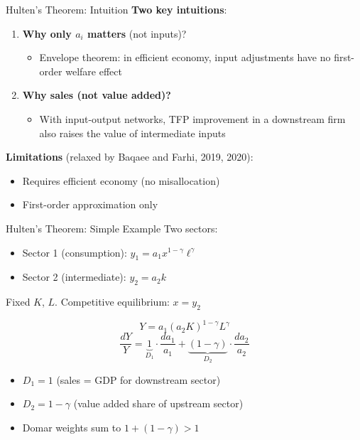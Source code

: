 \documentclass[blue]{beamer}
\begin{document}
\begin{frame}{Hulten's Theorem: Intuition}
	\textbf{Two key intuitions}:
	
	\bigskip
	\begin{enumerate}
		\item \textbf{Why only $a_i$ matters} (not inputs)?
		\begin{itemize}
			\item Envelope theorem: in efficient economy, input adjustments have no first-order welfare effect
		\end{itemize}
		
		\bigskip
		\item \textbf{Why sales (not value added)?}
		\begin{itemize}
			\item With input-output networks, TFP improvement in a downstream firm also raises the value of intermediate inputs
		\end{itemize}
	\end{enumerate}
	
	\bigskip
	\textbf{Limitations} (relaxed by Baqaee and Farhi, 2019, 2020):
	\begin{itemize}
		\item Requires efficient economy (no misallocation)
		\item First-order approximation only
	\end{itemize}
\end{frame}

\begin{frame}{Hulten's Theorem: Simple Example}
	Two sectors:
	\begin{itemize}
		\item Sector 1 (consumption): $y_1 = a_1 x^{1-\gamma} \ell^\gamma$
		\item Sector 2 (intermediate): $y_2 = a_2 k$
	\end{itemize}
	Fixed $K$, $L$. Competitive equilibrium: $x = y_2$
	
	\[
	Y = a_1 (a_2 K)^{1-\gamma} L^\gamma
	\]
	\[
	\frac{dY}{Y} = \underbrace{1}_{D_1} \cdot \frac{da_1}{a_1} + \underbrace{(1-\gamma)}_{D_2} \cdot \frac{da_2}{a_2}
	\]
	
	\begin{itemize}
		\item $D_1 = 1$ (sales = GDP for downstream sector)
		\item $D_2 = 1 - \gamma$ (value added share of upstream sector)
		\item Domar weights sum to $1 + (1-\gamma) > 1$
	\end{itemize}
\end{frame}
\end{document}
